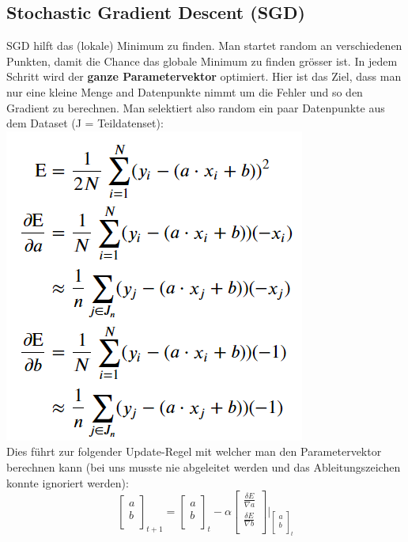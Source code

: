 \subsection{Stochastic Gradient Descent (SGD)}
SGD hilft das (lokale) Minimum zu finden. Man startet random an verschiedenen Punkten, damit die Chance das globale Minimum zu finden grösser ist. In jedem Schritt wird der\textbf{ ganze Parametervektor} optimiert.
Hier ist das Ziel, dass man nur eine kleine Menge and Datenpunkte nimmt um die Fehler und so den Gradient zu berechnen. Man selektiert also random ein paar Datenpunkte aus dem Dataset (J = Teildatenset):
\includegraphics[width=0.7\linewidth]{img/sgd_formula.png}\\
Dies führt zur folgender Update-Regel mit welcher man den Parametervektor berechnen kann (bei uns musste nie abgeleitet werden und das Ableitungszeichen konnte ignoriert werden):
    $$\begin{bmatrix}
       a \\
       b \\
    \end{bmatrix}_{t+1}
     = 
    \begin{bmatrix}
       a \\
       b \\
    \end{bmatrix}_{t}
     - \alpha     
    \begin{bmatrix}
       \frac{\delta E}{\nabla a} \\
       \frac{\delta E}{\nabla b} \\
    \end{bmatrix}
    |_{
    \begin{bmatrix}
       a \\
       b \\
    \end{bmatrix}_t
    }
    $$

